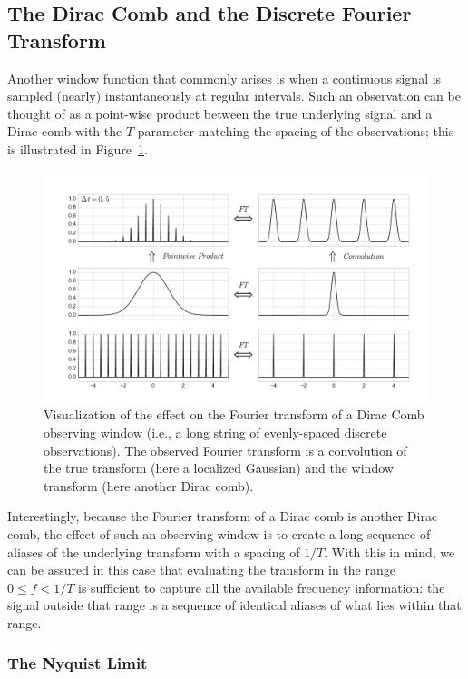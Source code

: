 \documentclass[preprint]{aastex}
\newcommand{\fig}[1]{Figure~\ref{fig:#1}}
\newcommand{\figlabel}[1]{\label{fig:#1}}
\newcommand{\sectlabel}[1]{\label{sect:#1}}
\begin{document}
\subsection{The Dirac Comb and the Discrete Fourier Transform}
Another window function that commonly arises is when a continuous signal is
sampled (nearly) instantaneously at regular intervals.
Such an observation can be thought of as a point-wise product between the true
underlying signal and a Dirac comb with the $T$ parameter matching the spacing
of the observations; this is illustrated in \fig{comb-window-1}.

\begin{figure}[ht]
  \centering
  \includegraphics[width=\textwidth]{fig07_comb_window_1}
  \caption{Visualization of the effect on the Fourier transform of a
    Dirac Comb observing window (i.e., a long string of evenly-spaced
    discrete observations). The observed Fourier
    transform is a convolution of the true transform (here a localized
    Gaussian) and the window transform (here another Dirac comb).
    \figlabel{comb-window-1}}
\end{figure}

Interestingly, because the Fourier transform of a Dirac comb is another Dirac
comb, the effect of such an observing window is to create a long sequence
of aliases of the underlying transform with a spacing of $1/T$.
With this in mind, we can be assured in this case that evaluating the
transform in the range $0 \le f < 1/T$ is sufficient to capture
all the available frequency information:
the signal outside that range is a sequence of identical aliases of
what lies within that range.

\subsubsection{The Nyquist Limit}
\sectlabel{nyquist}
\end{document}
